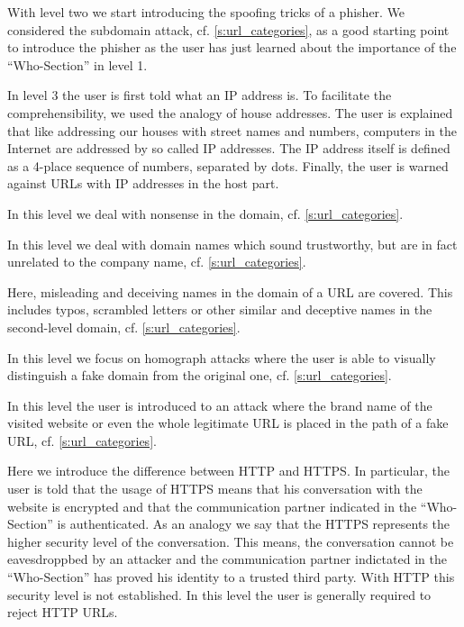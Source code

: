 \begin{description}[leftmargin=0cm]
	\item[Level 2:] With level two we start introducing the spoofing tricks of a phisher.
 We considered the subdomain attack, cf. \autoref{s:url_categories}, as a good starting point to introduce the phisher as the user has just learned about the importance of the ``Who-Section'' in level 1.
	\item[Level 3:] In level 3 the user is first told what an IP address is.
 To facilitate the comprehensibility, we used the analogy of house addresses.
 The user is explained that like addressing our houses with street names and numbers, computers in the Internet are addressed by so called IP addresses.
 The IP address itself is defined as a 4-place sequence of numbers, separated by dots.
 Finally, the user is warned against URLs with IP addresses in the host part.
	\item[Level 4:] In this level we deal with nonsense in the domain, cf. \autoref{s:url_categories}.
	\item[Level 5:] In this level we deal with domain names which sound trustworthy, but are in fact unrelated to the company name, cf. \autoref{s:url_categories}.
	\item[Level 6:] Here, misleading and deceiving names in the domain of a URL are covered.
 This includes typos, scrambled letters or other similar and deceptive names in the second-level domain, cf. \autoref{s:url_categories}.
	\item[Level 7:] In this level we focus on homograph attacks where the user is able to visually distinguish a fake domain from the original one, cf. \autoref{s:url_categories}.
	\item[Level 8:] In this level the user is introduced to an attack where the brand name of the visited website or even the whole legitimate URL is placed in the path of a fake URL, cf. \autoref{s:url_categories}.
	\item[Level 9:] Here we introduce the difference between HTTP and HTTPS. In particular, the user is told that the usage of HTTPS means that his conversation with the website is encrypted and that the communication partner indicated in the ``Who-Section'' is authenticated.
 As an analogy we say that the HTTPS represents the higher security level of the conversation.
 This means, the conversation cannot be eavesdroppbed by an attacker and the communication partner indictated in the ``Who-Section'' has proved his identity to a trusted third party.
 With HTTP this security level is not established.
In this level the user is generally required to reject HTTP URLs.

\end{description}
